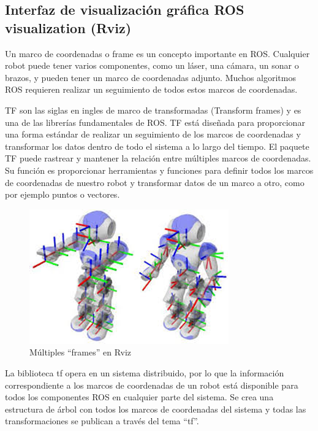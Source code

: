     \subsection{Interfaz de visualización gráfica ROS visualization (Rviz)}
    
        Un marco de coordenadas o frame es un concepto importante en ROS. Cualquier robot puede tener varios componentes, como un láser, una cámara, un sonar o brazos, y pueden tener un marco de coordenadas adjunto. Muchos algoritmos ROS requieren realizar un seguimiento de todos estos marcos de coordenadas.
        
        TF son las siglas en ingles de marco de transformadas (Transform frames) y es una de las librerías fundamentales de ROS. TF está diseñada para proporcionar una forma estándar de realizar un seguimiento de los marcos de coordenadas y transformar los datos dentro de todo el sistema a lo largo del tiempo. El paquete TF puede rastrear y mantener la relación entre múltiples marcos de coordenadas. Su función es proporcionar herramientas y funciones para definir todos los marcos de coordenadas de nuestro robot y transformar datos de un marco a otro, como por ejemplo puntos o vectores.
        
        \begin{figure}[htb]
            \centering
            \includegraphics[width=0.8\linewidth]{Main/Chapter3/Images3/3-6/ejemplo-multiples-frames-rviz.png}
            \caption{Múltiples ``frames'' en Rviz}
            \label{f:Cap3-6_frames_rviz}
        \end{figure}
        
        La biblioteca tf opera en un sistema distribuido, por lo que la información correspondiente a los marcos de coordenadas de un robot está disponible para todos los componentes ROS en cualquier parte del sistema. Se crea una estructura de árbol con todos los marcos de coordenadas del sistema y todas las transformaciones se publican a través del tema “tf”.
      
